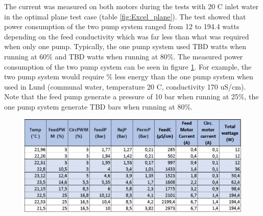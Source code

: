 The current was measured on both motors during the tests with 20 C inlet water in the optimal plane test case (table \ref{fig:Excel_plane}). The test showed that power consumption of the two pump system ranged from 12 to 194.4 watts depending on the feed conductivity which was far less than what was required when only one pump. Typically, the one pump system used TBD watts when running at 60\% and TBD watts when running at 80\%. The measured power consumption of the two pump system can be seen in figure \ref{fig:EnergySys2}. For example, the two pump system would require \% less energy than the one pump system when used in Lund (communal water, temperature 20 C, conductivity 170 uS/cm). Note that the feed pump generate a pressure of 10 bar when running at 25\%, the one pump system generate TBD bars when running at 80\%. 

\begin{figure}[H]
    \centering
    \includegraphics[width=1.1\textwidth]{EnergySys2}
    \caption{}
    \label{fig:EnergySys2}
\end{figure}














